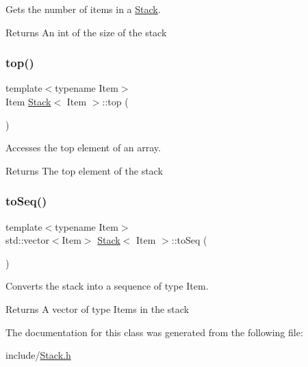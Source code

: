 Gets the number of items in a \hyperlink{class_stack}{Stack}. 

\begin{DoxyReturn}{Returns}
An int of the size of the stack 
\end{DoxyReturn}
\mbox{\label{class_stack_a84b12c3a32d914a499424888d34bca5e}} 
\subsubsection{\texorpdfstring{top()}{top()}}
{\footnotesize\ttfamily template$<$typename Item$>$ \\
Item \hyperlink{class_stack}{Stack}$<$ Item $>$\+::top (\begin{DoxyParamCaption}{ }\end{DoxyParamCaption})}



Accesses the top element of an array. 

\begin{DoxyReturn}{Returns}
The top element of the stack 
\end{DoxyReturn}
\mbox{\label{class_stack_a9fd3ed2f352a7f9128e8c7fc48bc038d}} 
\subsubsection{\texorpdfstring{to\+Seq()}{toSeq()}}
{\footnotesize\ttfamily template$<$typename Item$>$ \\
std\+::vector$<$Item$>$ \hyperlink{class_stack}{Stack}$<$ Item $>$\+::to\+Seq (\begin{DoxyParamCaption}{ }\end{DoxyParamCaption})}



Converts the stack into a sequence of type Item. 

\begin{DoxyReturn}{Returns}
A vector of type Items in the stack 
\end{DoxyReturn}


The documentation for this class was generated from the following file\+:\begin{DoxyCompactItemize}
\item 
include/\hyperlink{_stack_8h}{Stack.\+h}\end{DoxyCompactItemize}
